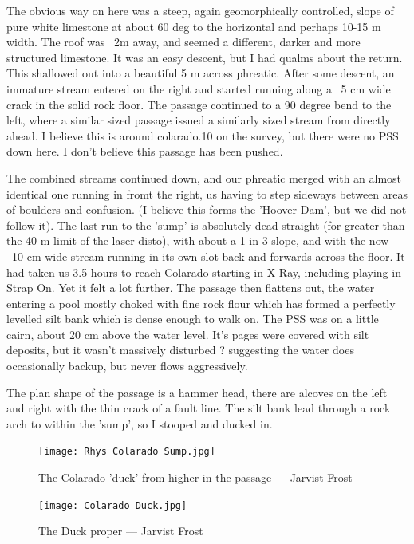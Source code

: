 \documentclass[onecolumn]{book}
\begin{document}
The obvious way on here was a steep, again geomorphically controlled, slope of pure white limestone at about 60 deg to the horizontal and perhaps 10-15 m width. The roof was ~2m away, and seemed a different, darker and more structured limestone. It was an easy descent, but I had qualms about the return.
This shallowed out into a beautiful 5 m across phreatic. After some descent, an immature stream entered on the right and started running along a ~5 cm wide crack in the solid rock floor. The passage continued to a 90 degree bend to the left, where a similar sized passage issued a similarly sized stream from directly ahead. I believe this is around colarado.10 on the survey, but there were no PSS down here. I don't believe this passage has been pushed.

The combined streams continued down, and our phreatic merged with an almost identical one running in fromt the right, us having to step sideways between areas of boulders and confusion. (I believe this forms the 'Hoover Dam', but we did not follow it).
The last run to the 'sump' is absolutely dead straight (for greater than the 40 m limit of the laser disto), with about a 1 in 3 slope, and with the now ~10 cm wide stream running in its own slot back and forwards across the floor. It had taken us 3.5 hours to reach Colarado starting in X-Ray, including playing in Strap On. Yet it felt a lot further.
The passage then flattens out, the water entering a pool mostly choked with fine rock flour which has formed a perfectly levelled silt bank which is dense enough to walk on. The PSS was on a little cairn, about 20 cm above the water level. It's pages were covered with silt deposits, but it wasn't massively disturbed ? suggesting the water does occasionally backup, but never flows aggressively.

The plan shape of the passage is a hammer head, there are alcoves on the left and right with the thin crack of a fault line. The silt bank lead through a rock arch to within the 'sump', so I stooped and ducked in.

\begin{figure}[h!]
\centering
\texttt{[image: Rhys Colarado Sump.jpg]}
\caption{The Colarado 'duck' from higher in the passage --- Jarvist Frost}
\label{Colarado Duck}
\end{figure}

\begin{figure}[h]
\centering
\texttt{[image: Colarado Duck.jpg]}
\caption{The Duck proper --- Jarvist Frost}
\label{Duck from close up}
\end{figure}
\end{document}
